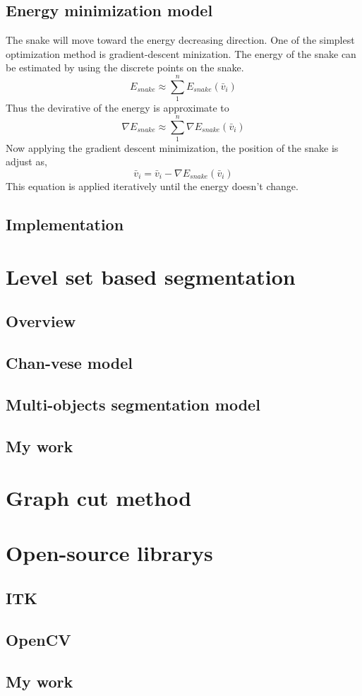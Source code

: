 \subsection{Energy minimization model}
The snake will move toward the energy decreasing direction. One of the simplest optimization method is gradient-descent minization\cite{snyman2005practical}. The energy of the snake can be estimated by using the discrete points on the snake. 
$$
E_{snake} \approx \sum_1^nE_{snake}(\bar{v}_i)
$$
Thus the devirative of the energy is approximate to
$$
\nabla E_{snake} \approx \sum_1^n \nabla E_{snake}(\bar{v}_i)
$$
Now applying the gradient descent minimization, the position of the snake is adjust as,
$$
\bar{v}_i = \bar{v}_i - \nabla E_{snake}(\bar{v}_i)
$$
This equation is applied iteratively until the energy doesn't change.
\subsection{Implementation}
\section{Level set based segmentation}
\subsection{Overview}
\subsection{Chan-vese model}
\subsection{Multi-objects segmentation model}
\subsection{My work}
\section{Graph cut method}
\section{Open-source librarys}
\subsection{ITK}
\subsection{OpenCV}
\subsection{My work}
